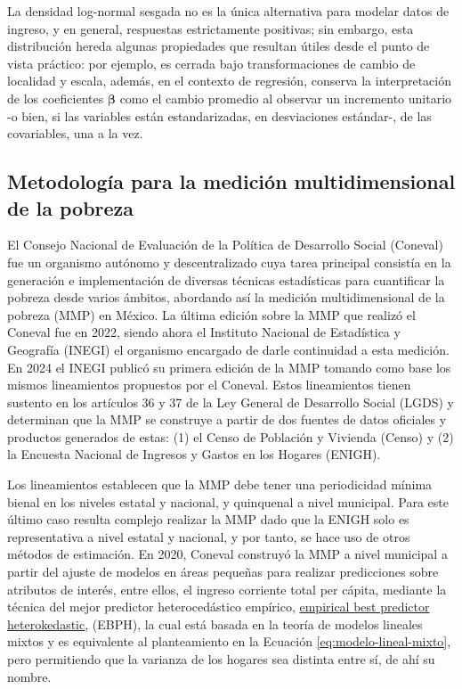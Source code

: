 \documentclass[11pt]{article}
\begin{document}
La densidad log-normal sesgada no es la única alternativa para modelar datos de ingreso, y en general, respuestas estrictamente positivas; sin embargo, esta distribución hereda algunas propiedades que resultan útiles desde el punto de vista práctico: por ejemplo, es cerrada bajo transformaciones de cambio de localidad y escala, además, en el contexto de regresión, conserva la interpretación de los coeficientes $\boldsymbol{\beta}$ como el cambio promedio al observar un incremento unitario -o bien, si las variables están estandarizadas, en desviaciones estándar-, de las covariables, una a la vez.

\subsection{Metodología para la medición multidimensional de la pobreza}
\label{subsec:antecedentes}

El Consejo Nacional de Evaluación de la Política de Desarrollo Social (Coneval) fue un organismo autónomo y descentralizado cuya tarea principal consistía en la generación e implementación de diversas técnicas estadísticas para cuantificar la pobreza desde varios ámbitos, abordando así la medición multidimensional de la pobreza (MMP) en México. La última edición sobre la MMP que realizó el Coneval fue en 2022, siendo ahora el Instituto Nacional de Estadística y Geografía (INEGI) el organismo encargado de darle continuidad a esta medición. En 2024 el INEGI publicó su primera edición de la MMP tomando como base los mismos  lineamientos propuestos por el Coneval. Estos lineamientos tienen sustento en los artículos 36 y 37 de la Ley General de Desarrollo Social (LGDS) y determinan que la MMP se construye a partir de dos fuentes de datos oficiales y productos generados de estas: (1) el Censo de Población y Vivienda (Censo) y (2) la Encuesta Nacional de Ingresos y Gastos en los Hogares (ENIGH). 

Los lineamientos establecen que la MMP debe tener una periodicidad mínima bienal en los niveles estatal y nacional, y quinquenal a nivel municipal. Para este último caso resulta complejo realizar la MMP dado que la ENIGH solo es representativa a nivel estatal y nacional, y por tanto, se hace uso de otros métodos de estimación. En 2020, Coneval construyó la MMP a nivel municipal a partir del ajuste de modelos en áreas pequeñas para realizar predicciones sobre atributos de interés, entre ellos, el ingreso corriente total per cápita, mediante la técnica del mejor predictor heterocedástico empírico,  \underline{empirical best predictor heterokedastic}, (EBPH), la cual está basada en la teoría de modelos lineales mixtos y es equivalente al planteamiento en la Ecuación \ref{eq:modelo-lineal-mixto}, pero permitiendo que la varianza de los hogares sea distinta entre sí, de ahí su nombre.
\end{document}
